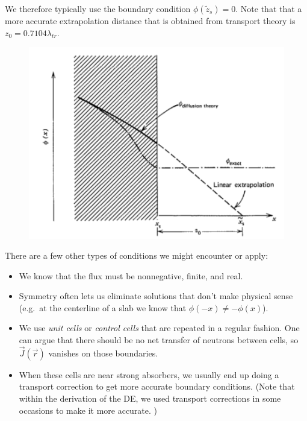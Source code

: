 \documentclass[12pt]{article}
\newcommand{\rvec}{\ensuremath{\vec{r}}}
\begin{document}
We therefore typically use the boundary condition $\phi(\tilde{z}_s) = 0$. 
Note that that a more accurate extrapolation distance that is obtained from transport theory is $z_0 = 0.7104 \lambda_{tr}$.

\begin{figure}
    \begin{center}
    \includegraphics[keepaspectratio, width = 3 in]{extrapolation}
    \end{center}
    \label{fig:phase_space}
\end{figure}

There are a few other types of conditions we might encounter or apply:
\begin{itemize}
\item We know that the flux must be nonnegative, finite, and real. 
\item Symmetry often lets us eliminate solutions that don't make physical sense (e.g.\ at the centerline of a slab we know that $\phi(-x) \neq - \phi(x)$). 
\item We use \textit{unit cells} or \textit{control cells} that are repeated in a regular fashion. 
One can argue that there should be no net transfer of neutrons between cells, so $\vec{J}(\rvec)$ vanishes on those boundaries.
\item When these cells are near strong absorbers, we usually end up doing a transport correction to get more accurate boundary conditions. 
(Note that within the derivation of the DE, we used transport corrections in some occasions to make it more accurate. )
\end{itemize}
\end{document}
